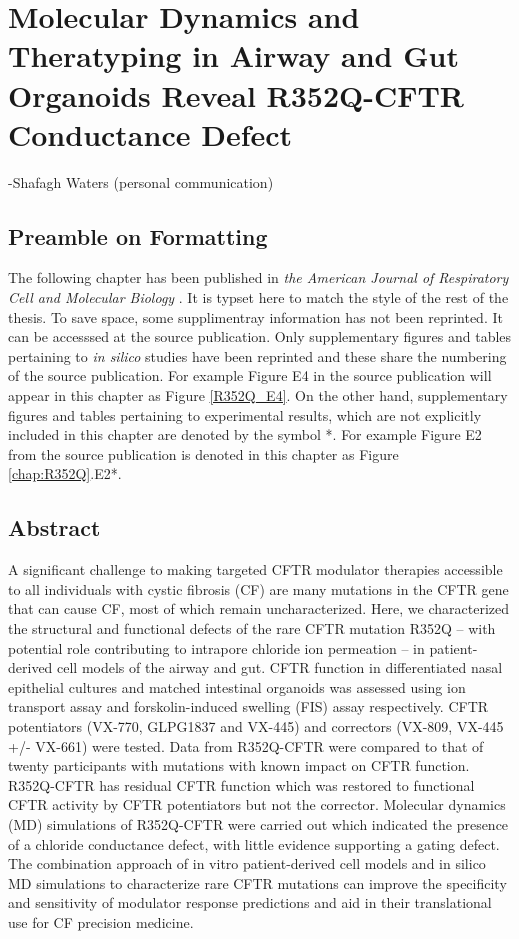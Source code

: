 \chapter{Molecular Dynamics and Theratyping in Airway and Gut Organoids Reveal R352Q-CFTR Conductance Defect}
\setcounter{figure}{0}
\renewcommand{\thefigure}{\arabic{chapter}.\arabic{figure}}
\label{chap:R352Q}
 {-Shafagh Waters (personal communication)}

\section*{\centering Preamble on Formatting} 
The following chapter has been published in \textit{the American Journal of Respiratory Cell and Molecular Biology} \cite{wong2022a}. It is typset here to match the style of the rest of the thesis. To save space, some supplimentray information has not been reprinted. It can be accesssed at the source publication. Only supplementary figures and tables pertaining to \textit{in silico} studies have been reprinted and these share the numbering of the source publication. For example Figure E4 in the source publication will appear in this chapter as Figure \ref{R352Q_E4}. On the other hand, supplementary figures and tables pertaining to experimental results, which are not explicitly included in this chapter are denoted by the symbol *. For example Figure E2 from the source publication is denoted in this chapter as Figure \ref{chap:R352Q}.E2*.

\section*{\centering Abstract} 
A significant challenge to making targeted CFTR modulator therapies accessible to all individuals with cystic fibrosis (CF) are many mutations in the CFTR gene that can cause CF, most of which remain uncharacterized. Here, we characterized the structural and functional defects of the rare CFTR mutation R352Q – with potential role contributing to intrapore chloride ion permeation – in patient-derived cell models of the airway and gut. CFTR function in differentiated nasal epithelial cultures and matched intestinal organoids was assessed using ion transport assay and forskolin-induced swelling (FIS) assay respectively. CFTR potentiators (VX-770, GLPG1837 and VX-445) and correctors (VX-809, VX-445 +/- VX-661) were tested.  Data from R352Q-CFTR were compared to that of twenty participants with mutations with known impact on CFTR function. R352Q-CFTR has residual CFTR function which was restored to functional CFTR activity by CFTR potentiators but not the corrector. Molecular dynamics (MD) simulations of R352Q-CFTR were carried out which indicated the presence of a chloride conductance defect, with little evidence supporting a gating defect. The combination approach of in vitro patient-derived cell models and in silico MD simulations to characterize rare CFTR mutations can improve the specificity and sensitivity of modulator response predictions and aid in their translational use for CF precision medicine.



